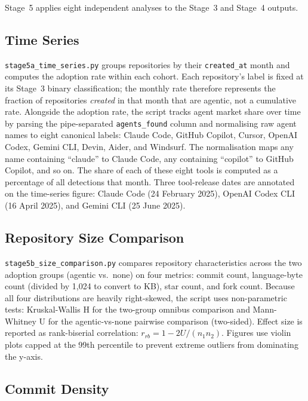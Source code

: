 Stage~5 applies eight independent analyses to the Stage~3 and Stage~4 outputs.

\subsection{Time Series}

\texttt{stage5a\_time\_series.py} groups repositories by their \texttt{created\_at} month and computes the adoption rate within each cohort. Each repository's label is fixed at its Stage~3 binary classification; the monthly rate therefore represents the fraction of repositories \emph{created} in that month that are agentic, not a cumulative rate. Alongside the adoption rate, the script tracks agent market share over time by parsing the pipe-separated \texttt{agents\_found} column and normalising raw agent names to eight canonical labels: Claude Code, GitHub Copilot, Cursor, OpenAI Codex, Gemini CLI, Devin, Aider, and Windsurf. The normalisation maps any name containing ``claude'' to Claude Code, any containing ``copilot'' to GitHub Copilot, and so on. The share of each of these eight tools is computed as a percentage of all detections that month. Three tool-release dates are annotated on the time-series figure: Claude Code (24 February 2025), OpenAI Codex CLI (16 April 2025), and Gemini CLI (25 June 2025).

\subsection{Repository Size Comparison}

\texttt{stage5b\_size\_comparison.py} compares repository characteristics across the two adoption groups (agentic vs.\ none) on four metrics: commit count, language-byte count (divided by 1,024 to convert to KB), star count, and fork count. Because all four distributions are heavily right-skewed, the script uses non-parametric tests: Kruskal-Wallis H for the two-group omnibus comparison and Mann-Whitney U for the agentic-vs-none pairwise comparison (two-sided). Effect size is reported as rank-biserial correlation: $r_{rb} = 1 - 2U / (n_1 n_2)$. Figures use violin plots capped at the 99th percentile to prevent extreme outliers from dominating the y-axis.

\subsection{Commit Density}

